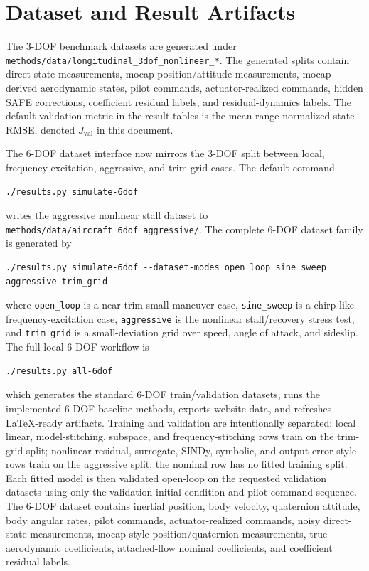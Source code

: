 \documentclass[11pt]{article}
\begin{document}
\section{Dataset and Result Artifacts}

The 3-DOF benchmark datasets are generated under \texttt{methods/data/longitudinal\_3dof\_nonlinear\_*}. The generated splits contain direct state measurements, mocap position/attitude measurements, mocap-derived aerodynamic states, pilot commands, actuator-realized commands, hidden SAFE corrections, coefficient residual labels, and residual-dynamics labels. The default validation metric in the result tables is the mean range-normalized state RMSE, denoted $J_{\mathrm{val}}$ in this document.

The 6-DOF dataset interface now mirrors the 3-DOF split between local, frequency-excitation, aggressive, and trim-grid cases. The default command
\begin{verbatim}
./results.py simulate-6dof
\end{verbatim}
writes the aggressive nonlinear stall dataset to \texttt{methods/data/aircraft\_6dof\_aggressive/}. The complete 6-DOF dataset family is generated by
\begin{verbatim}
./results.py simulate-6dof --dataset-modes open_loop sine_sweep aggressive trim_grid
\end{verbatim}
where \texttt{open\_loop} is a near-trim small-maneuver case, \texttt{sine\_sweep} is a chirp-like frequency-excitation case, \texttt{aggressive} is the nonlinear stall/recovery stress test, and \texttt{trim\_grid} is a small-deviation grid over speed, angle of attack, and sideslip. The full local 6-DOF workflow is
\begin{verbatim}
./results.py all-6dof
\end{verbatim}
which generates the standard 6-DOF train/validation datasets, runs the implemented 6-DOF baseline methods, exports website data, and refreshes LaTeX-ready artifacts. Training and validation are intentionally separated: local linear, model-stitching, subspace, and frequency-stitching rows train on the trim-grid split; nonlinear residual, surrogate, SINDy, symbolic, and output-error-style rows train on the aggressive split; the nominal row has no fitted training split. Each fitted model is then validated open-loop on the requested validation datasets using only the validation initial condition and pilot-command sequence. The 6-DOF dataset contains inertial position, body velocity, quaternion attitude, body angular rates, pilot commands, actuator-realized commands, noisy direct-state measurements, mocap-style position/quaternion measurements, true aerodynamic coefficients, attached-flow nominal coefficients, and coefficient residual labels.
\end{document}
